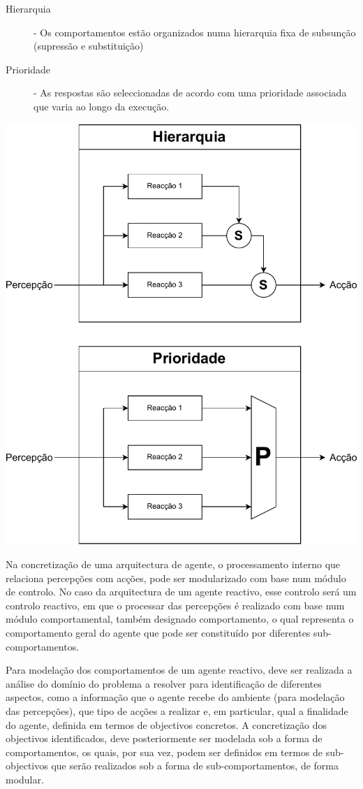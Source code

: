 \documentclass[a4paper,12pt]{article}
\begin{document}
\begin{description}
	\item[Hierarquia] - Os comportamentos estão organizados numa hierarquia fixa de subsunção (supressão e substituição)
	\item[Prioridade] - As respostas são seleccionadas de acordo com uma prioridade associada que varia ao longo da execução.
\end{description}
\includegraphics[scale=0.5]{mecanismosselecao}

Na concretização de uma arquitectura de agente, o processamento interno que relaciona percepções com acções, pode ser modularizado com base num módulo de controlo.
No caso da arquitectura de um agente reactivo, esse controlo será um controlo reactivo, em que o processar das percepções é realizado com base num módulo comportamental, também designado comportamento, o qual representa o comportamento geral do agente que pode ser constituído por diferentes sub-comportamentos.

Para modelação dos comportamentos de um agente reactivo, deve ser realizada a análise do domínio do problema a resolver para identificação de diferentes aspectos, como a informação que o agente recebe do ambiente (para modelação das percepções), que tipo de acções a realizar e, em particular, qual a finalidade do agente, definida em termos de objectivos concretos.
A concretização dos objectivos identificados, deve posteriormente ser modelada sob a forma de comportamentos, os quais, por sua vez, podem ser definidos em termos de sub-objectivos que serão realizados sob a forma de sub-comportamentos, de forma modular.
\end{document}
